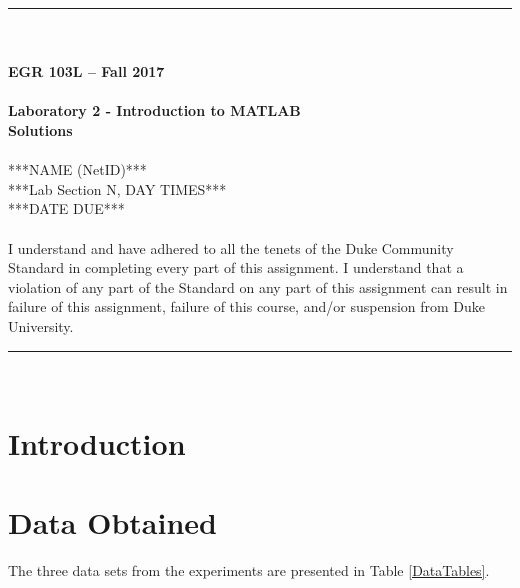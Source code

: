 \documentclass{article}
\begin{document}
\begin{center}
\rule{6.5in}{0.5mm}\\~\\
\textbf{\large EGR 103L -- Fall 2017}\\~\\
\textbf{\huge Laboratory 2 - Introduction to MATLAB\\
Solutions}\\~\\
***NAME (NetID)***\\
***Lab Section N, DAY TIMES***\\
***DATE DUE***\\~\\
{\small I understand and have adhered to all the tenets of the Duke
  Community Standard in completing every part of this assignment.  I
  understand that a violation of any part of the Standard on any part
  of this assignment can result in failure of this assignment, failure
  of this course, and/or suspension from Duke University.} 
\rule{6.5in}{0.5mm}\\
\end{center}
\tableofcontents
\listoffigures
\pagebreak

\section{Introduction}

\section{Data Obtained}
The three data sets from the experiments are presented in Table
\ref{DataTables}.
\end{document}
